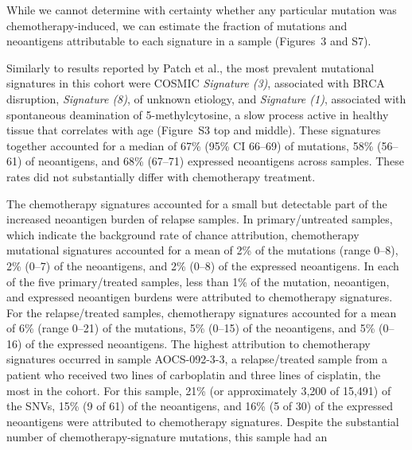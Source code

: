 \documentclass[linenumbers]{bmcart}
\begin{document}

While we cannot determine with certainty whether any particular mutation was chemotherapy-induced, we can estimate the fraction of mutations and neoantigens attributable to each signature in a sample (Figures~3 and S7).

Similarly to results reported by Patch et al., the most prevalent mutational signatures in this cohort were COSMIC \textit{Signature (3)}, associated with BRCA disruption, \textit{Signature (8)}, of unknown etiology, and \textit{Signature (1)}, associated with spontaneous deamination of 5-methylcytosine, a slow process active in healthy tissue that correlates with age (Figure~S3 top and middle). These signatures together accounted for a median of 67\% (95\% CI 66--69) of mutations, 58\% (56--61) of neoantigens, and 68\% (67--71) expressed neoantigens across samples. These rates did not substantially differ with chemotherapy treatment.

The chemotherapy signatures accounted for a small but detectable part of the increased neoantigen burden of relapse samples. In primary/untreated samples, which indicate the background rate of chance attribution, chemotherapy mutational signatures accounted for a mean of 2\% of the mutations (range 0--8), 2\% (0--7) of the neoantigens, and 2\% (0--8) of the expressed neoantigens. In each of the five primary/treated samples, less than 1\% of the mutation, neoantigen, and expressed neoantigen burdens were attributed to chemotherapy signatures. For the relapse/treated samples, chemotherapy signatures accounted for a mean of 6\% (range 0--21) of the mutations, 5\% (0--15) of the neoantigens, and 5\% (0--16) of the expressed neoantigens. The highest attribution to chemotherapy signatures occurred in sample AOCS-092-3-3, a relapse/treated sample from a patient who received two lines of carboplatin and three lines of cisplatin, the most in the cohort. For this sample, 21\% (or approximately 3,200 of 15,491) of the SNVs, 15\% (9 of 61) of the neoantigens, and 16\% (5 of 30) of the expressed neoantigens were attributed to chemotherapy signatures. Despite the substantial number of chemotherapy-signature mutations, this sample had an 
\end{document}
